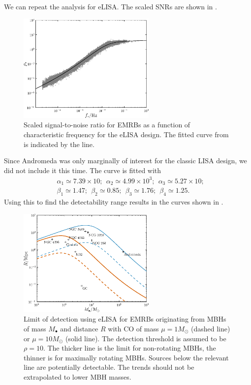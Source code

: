 We can repeat the analysis for eLISA. The scaled SNRs are shown in .
\begin{figure}[!htp]
\begin{center}
 \includegraphics[width=0.6\textwidth]{./images/Fig_SNR_scaled_fit_eLISA}
 \caption{Scaled signal-to-noise ratio for EMRBs as a function of characteristic frequency for the eLISA design. The fitted curve from  is indicated by the line.\label{fig:scaled-SNR-eLISA}}%
   \end{center}
\end{figure}
Since Andromeda was only marginally of interest for the classic LISA design, we did not include it this time. The curve is fitted with
\begin{equation}
\begin{split}
&\alpha_1 \simeq 7.39 \times 10; \ \  \alpha_2 \simeq 4.99 \times 10^3; \ \  \alpha_3 \simeq 5.27 \times 10;\\
&\beta_1 \simeq 1.47; \ \  \beta_2 \simeq 0.85; \ \  \beta_3 \simeq 1.76; \ \  \beta_4 \simeq 1.25.
\end{split}
\end{equation}
Using this to find the detectability range results in the curves shown in .
\begin{figure}[!htp]
\begin{center}
 \includegraphics[width=0.6\textwidth]{./images/Fig_M_R_detect_2}
 \caption{Limit of detection using eLISA for EMRBs originating from MBHs of mass $M_\bullet$ and distance $R$ with CO of mass $\mu = 1 M_\odot$ (dashed line) or $\mu = 10 M_\odot$ (solid line). The detection threshold is assumed to be $\rho = 10$. The thicker line is the limit for non-rotating MBHs, the thinner is for maximally rotating MBHs. Sources below the relevant line are potentially detectable. The trends should not be extrapolated to lower MBH masses.\label{fig:detect-eLISA}}
   \end{center}
\end{figure}
